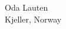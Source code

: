 \vspace{1.0cm}
\begin{flushright}
Oda Lauten      \\
Kjeller, Norway \\
\month~\year      \\
\end{flushright}

